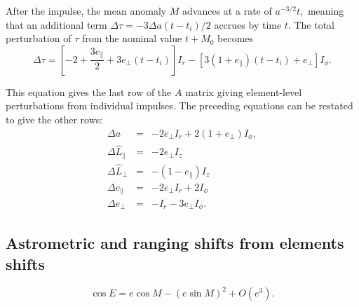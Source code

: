\documentclass[linenumbers, onecolumn]{aastex631}
\newcommand{\matA}{A}
\newcommand{\Lhat}{\hat L}
\begin{document}
After the impulse, the mean anomaly $M$ advances at a rate of $a^{-3/2}t,$ meaning that an additional term $\Delta\tau = -3\Delta a (t-t_i)/2$ accrues by time $t$. The total perturbation of $\tau$ from the nominal value $t+M_0$ becomes
\begin{equation}
  \Delta\tau= \left[-2+\frac{3e_\parallel}{2} +3 e_\perp (t-t_i)\right] I_r  - \left[3(1+e_\parallel)(t-t_i) + e_\perp\right] I_\phi.
  \label{eq:dtau}
\end{equation}

This equation gives the last row of the $\matA$ matrix giving element-level perturbations from individual impulses.  The preceding equations can be restated to give the other rows:
\begin{eqnarray}
  \Delta a & = & -2e_\perp I_r + 2(1+e_\perp) I_\phi, \\
  \Delta \Lhat_\parallel & = & -2e_\perp I_z \\
  \Delta \Lhat_\perp & = & -(1-e_\parallel) I_z \\
  \Delta e_\parallel & = &  -2e_\perp I_r + 2 I_\phi \\
  \Delta e_\perp & = & -I_r - 3e_\perp I_\phi.
\end{eqnarray}

\subsection{Astrometric and ranging shifts from elements shifts}
\begin{equation}
  \label{eq:Ee2}
  \cos E  =  e\cos M - (e \sin M)^2 + O(e^3).
\end{equation}
\end{document}
